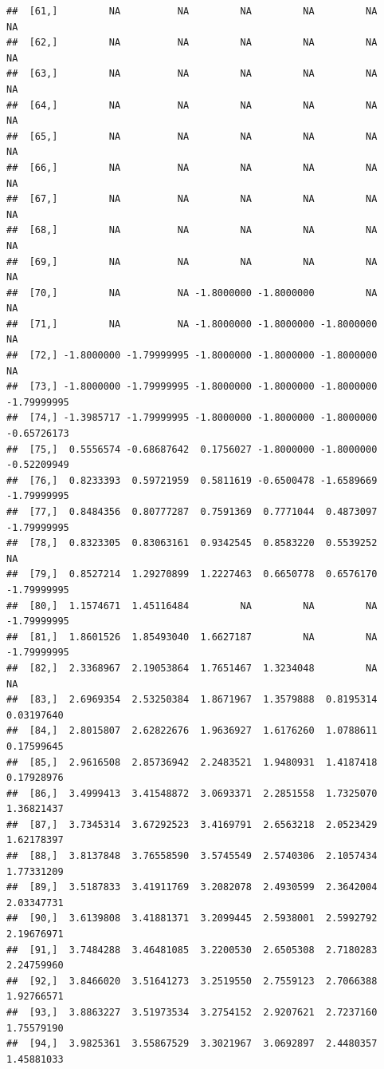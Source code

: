 \documentclass{article}\usepackage[]{graphicx}\usepackage[]{color}
\makeatletter
\newenvironment{kframe}{%
 \def\at@end@of@kframe{}%
 \ifinner\ifhmode%
  \def\at@end@of@kframe{\end{minipage}}%
  \begin{minipage}{\columnwidth}%
 \fi\fi%
 \def\FrameCommand##1{\hskip\@totalleftmargin \hskip-\fboxsep
 \colorbox{shadecolor}{##1}\hskip-\fboxsep
     \hskip-\linewidth \hskip-\@totalleftmargin \hskip\columnwidth}%
 \MakeFramed {\advance\hsize-\width
   \@totalleftmargin\z@ \linewidth\hsize
   \@setminipage}}%
 {\par\unskip\endMakeFramed%
 \at@end@of@kframe}
\newenvironment{knitrout}{}{} %
\makeatother
\begin{document}
\begin{knitrout}
\begin{kframe}
\begin{verbatim}
##  [61,]         NA          NA         NA         NA         NA          NA
##  [62,]         NA          NA         NA         NA         NA          NA
##  [63,]         NA          NA         NA         NA         NA          NA
##  [64,]         NA          NA         NA         NA         NA          NA
##  [65,]         NA          NA         NA         NA         NA          NA
##  [66,]         NA          NA         NA         NA         NA          NA
##  [67,]         NA          NA         NA         NA         NA          NA
##  [68,]         NA          NA         NA         NA         NA          NA
##  [69,]         NA          NA         NA         NA         NA          NA
##  [70,]         NA          NA -1.8000000 -1.8000000         NA          NA
##  [71,]         NA          NA -1.8000000 -1.8000000 -1.8000000          NA
##  [72,] -1.8000000 -1.79999995 -1.8000000 -1.8000000 -1.8000000          NA
##  [73,] -1.8000000 -1.79999995 -1.8000000 -1.8000000 -1.8000000 -1.79999995
##  [74,] -1.3985717 -1.79999995 -1.8000000 -1.8000000 -1.8000000 -0.65726173
##  [75,]  0.5556574 -0.68687642  0.1756027 -1.8000000 -1.8000000 -0.52209949
##  [76,]  0.8233393  0.59721959  0.5811619 -0.6500478 -1.6589669 -1.79999995
##  [77,]  0.8484356  0.80777287  0.7591369  0.7771044  0.4873097 -1.79999995
##  [78,]  0.8323305  0.83063161  0.9342545  0.8583220  0.5539252          NA
##  [79,]  0.8527214  1.29270899  1.2227463  0.6650778  0.6576170 -1.79999995
##  [80,]  1.1574671  1.45116484         NA         NA         NA -1.79999995
##  [81,]  1.8601526  1.85493040  1.6627187         NA         NA -1.79999995
##  [82,]  2.3368967  2.19053864  1.7651467  1.3234048         NA          NA
##  [83,]  2.6969354  2.53250384  1.8671967  1.3579888  0.8195314  0.03197640
##  [84,]  2.8015807  2.62822676  1.9636927  1.6176260  1.0788611  0.17599645
##  [85,]  2.9616508  2.85736942  2.2483521  1.9480931  1.4187418  0.17928976
##  [86,]  3.4999413  3.41548872  3.0693371  2.2851558  1.7325070  1.36821437
##  [87,]  3.7345314  3.67292523  3.4169791  2.6563218  2.0523429  1.62178397
##  [88,]  3.8137848  3.76558590  3.5745549  2.5740306  2.1057434  1.77331209
##  [89,]  3.5187833  3.41911769  3.2082078  2.4930599  2.3642004  2.03347731
##  [90,]  3.6139808  3.41881371  3.2099445  2.5938001  2.5992792  2.19676971
##  [91,]  3.7484288  3.46481085  3.2200530  2.6505308  2.7180283  2.24759960
##  [92,]  3.8466020  3.51641273  3.2519550  2.7559123  2.7066388  1.92766571
##  [93,]  3.8863227  3.51973534  3.2754152  2.9207621  2.7237160  1.75579190
##  [94,]  3.9825361  3.55867529  3.3021967  3.0692897  2.4480357  1.45881033

\end{verbatim}
\end{kframe}
\end{knitrout}
\end{document}
